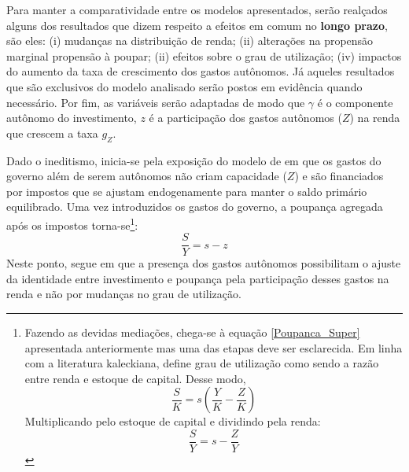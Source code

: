 Para manter a comparatividade entre os modelos apresentados, serão realçados alguns dos resultados que dizem respeito a efeitos em comum no \textbf{longo prazo}, são eles: (i) mudanças na distribuição de renda; (ii) alterações na propensão marginal propensão à poupar; (ii) efeitos sobre o grau de utilização; (iv) impactos do aumento da taxa de crescimento dos gastos autônomos. Já aqueles resultados que são exclusivos do modelo analisado serão postos em evidência quando necessário. Por fim, as variáveis serão adaptadas de modo que $\gamma$ é o componente autônomo do investimento,  $z$ é a participação dos gastos autônomos ($Z$) na renda que crescem a taxa $g_Z$.


Dado o ineditismo, inicia-se pela exposição do modelo de \textcite{allain_tackling_2015} em que os gastos do governo além de serem autônomos não criam capacidade ($Z$) e são financiados por impostos que se ajustam endogenamente para manter o saldo primário equilibrado.  Uma vez introduzidos os gastos do governo, a poupança agregada após os impostos torna-se\footnote{Fazendo as devidas mediações, chega-se à equação \ref{Poupanca_Super} apresentada anteriormente mas uma das etapas deve ser esclarecida. Em linha com a literatura kaleckiana, \textcite{allain_tackling_2015} define grau de utilização como sendo a razão entre renda e estoque de capital. Desse modo, 
	$$
	\frac{S}{K} = s\left(\frac{Y}{K} - \frac{Z}{K}\right) 
	$$
	Multiplicando pelo estoque de capital e dividindo pela renda:
	$$
	\frac{S}{Y} = s - \frac{Z}{Y}
	$$}:
$$
\frac{S}{Y} = s - z
$$
 Neste ponto, \textcite[p.~10]{allain_tackling_2015} segue \textcite{serrano_sraffian_1995} em que a presença dos gastos autônomos possibilitam o ajuste da identidade entre investimento e poupança pela participação desses gastos na renda e não por mudanças no grau de utilização. 

